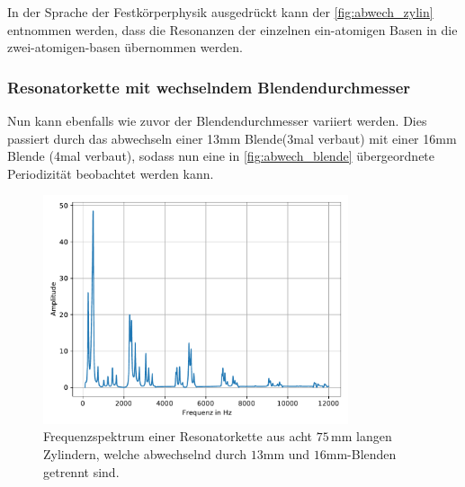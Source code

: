 \noindent
In der Sprache der Festkörperphysik ausgedrückt kann der \autoref{fig:abwech_zylin} entnommen werden, dass die Resonanzen der einzelnen ein-atomigen Basen in 
die zwei-atomigen-basen übernommen werden.

\subsubsection{Resonatorkette mit wechselndem Blendendurchmesser}
Nun kann ebenfalls wie zuvor der Blendendurchmesser variiert werden. Dies passiert durch das abwechseln einer 13mm Blende(3mal verbaut) mit einer 16mm Blende (4mal verbaut), sodass 
nun eine in \autoref{fig:abwech_blende} übergeordnete Periodizität beobachtet werden kann.

\begin{figure}
    \center
    \includegraphics[width=0.8\textwidth]{pic/13u16.pdf}
    \caption{Frequenzspektrum einer Resonatorkette aus acht $75\,$mm langen Zylindern, welche abwechselnd durch $13$mm und $16$mm-Blenden getrennt sind.}
    \label{fig:abwech_blende}
\end{figure}
